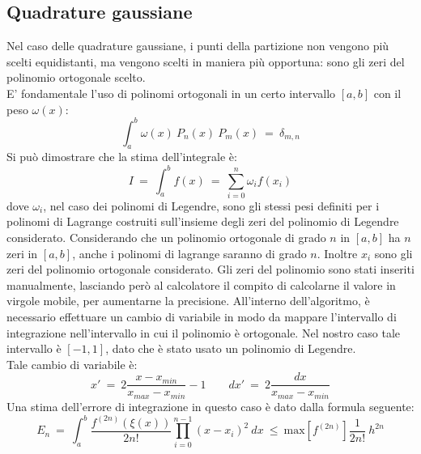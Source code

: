\subsection{Quadrature gaussiane}
Nel caso delle quadrature gaussiane, i punti della partizione non vengono più scelti equidistanti,
ma vengono scelti in maniera più opportuna: sono gli zeri del polinomio ortogonale scelto.\\
E' fondamentale l'uso di polinomi ortogonali in un certo intervallo $[a,b]$ con il peso $\omega(x)$:
$$
	\int_a^b \omega(x)\ P_n{(x)} \ P_m{(x)} \ = \ \delta_{m,n}
$$
Si può dimostrare che la stima dell'integrale è:
$$
 I \ = \  \int_a^b f(x) \ = \ \sum_{i=0}^n \omega_i f(x_i)
$$
dove $\omega_i$, nel caso dei polinomi di Legendre, sono gli stessi pesi definiti per i polinomi di Lagrange costruiti sull'insieme degli zeri
del polinomio di Legendre considerato. Considerando che un polinomio ortogonale di grado $n$ in $[a,b]$ ha $n$ zeri in $[a,b]$, anche i polinomi
di lagrange saranno di grado $n$. Inoltre $x_i$ sono gli zeri del polinomio ortogonale considerato.
Gli zeri del polinomio sono stati inseriti manualmente, lasciando però al calcolatore il compito di calcolarne il valore in virgole mobile,
per aumentarne la precisione.
All'interno dell'algoritmo, è necessario effettuare un cambio di variabile in modo da mappare l'intervallo
di integrazione nell'intervallo in cui il polinomio è ortogonale. Nel nostro caso tale intervallo è $[-1,1]$,
dato che è stato usato un polinomio di Legendre.\\
Tale cambio di variabile è:
$$
	x' \ = \ 2 \frac{x - x_{min} }{x_{max}-x_{min}} - 1 \qquad dx'  \ = \ 2 \frac{dx}{x_{max}-x_{min}}
$$
Una stima dell'errore di integrazione in questo caso è dato dalla formula seguente:
$$
E_n  \ = \  \int_a^b \frac{ f^{(2n)}(\xi (x))}{2n!} \prod_{i=0}^{n-1} (x-x_i)^2 \ dx \ \leq \ \mbox{max} \left[f^{(2n)}\right] \frac{1}{2n!}\ h^{2n}  
$$
